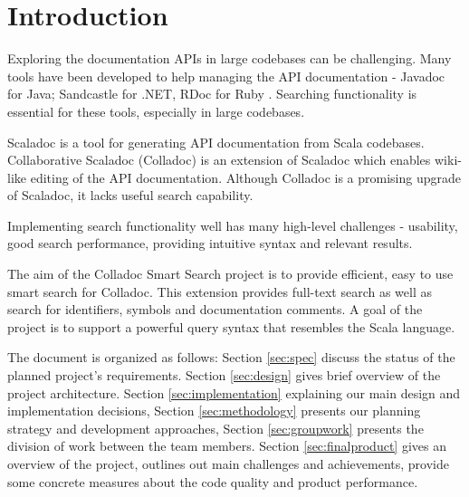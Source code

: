 \section{Introduction}\label{sec:intro}
Exploring the documentation APIs in large codebases can be challenging. Many tools have been developed to help managing the API documentation - Javadoc for Java; Sandcastle for .NET, RDoc for Ruby . Searching functionality is essential for these tools, especially in large codebases. 

Scaladoc is a tool for generating API documentation from Scala codebases. Collaborative Scaladoc (Colladoc) is an extension of Scaladoc which enables wiki-like editing of the API documentation. Although Colladoc is a promising upgrade of Scaladoc, it lacks useful search capability.

Implementing search functionality well has many high-level challenges - usability, good search performance, providing intuitive syntax and relevant results.

The aim of the Colladoc Smart Search project is to provide efficient, easy to use smart search for Colladoc. This extension provides full-text search as well as search for identifiers, symbols and documentation comments. A goal of the project is to support a powerful query syntax that resembles the Scala language.

The document is organized as follows: Section \ref{sec:spec} discuss the status of the planned project’s requirements. Section \ref{sec:design} gives brief overview of the project architecture. Section \ref{sec:implementation} explaining our main design and implementation decisions, Section \ref{sec:methodology} presents our planning strategy and development approaches, Section \ref{sec:groupwork} presents the division of work between the team members. Section \ref{sec:finalproduct} gives an overview of the project, outlines out main challenges and achievements, provide some concrete measures about the code quality and product performance. 